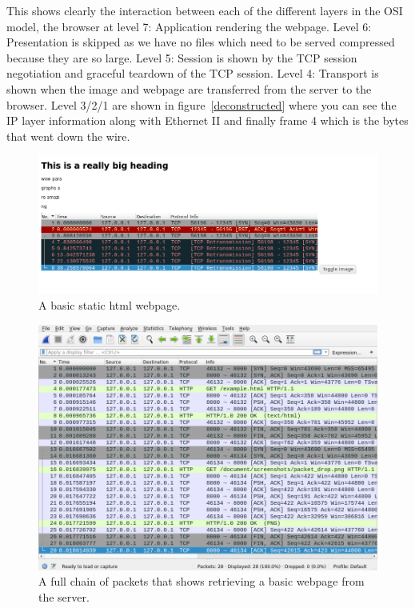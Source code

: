 \documentclass[titlepage]{article}
\begin{document}
This shows clearly the interaction between each of the different layers in the OSI model,
the browser at level 7: Application rendering the webpage. Level 6: Presentation is skipped as
we have no files which need to be served compressed because they are so large. Level 5: Session
is shown by the TCP session negotiation and graceful teardown of the TCP session. Level 4: Transport
is shown when the image and webpage are transferred from the server to the browser. Level 3/2/1
are shown in figure~\ref{deconstructed} where you can see the IP layer information along with
Ethernet II and finally frame 4 which is the bytes that went down the wire.

\begin{figure}[H]
  \centering
  \includegraphics[width=\textwidth]{screenshots/basic_webpage.png}
  \caption{%
    A basic static \gls{html} webpage.
  }\label{basicwebpage}
\end{figure}

\begin{figure}[H]
  \centering
  \includegraphics[width=\textwidth]{screenshots/website_get.png}
  \caption{%
    A full chain of packets that shows retrieving a basic webpage
    from the server.
  }\label{getrequest}
\end{figure}
\end{document}
